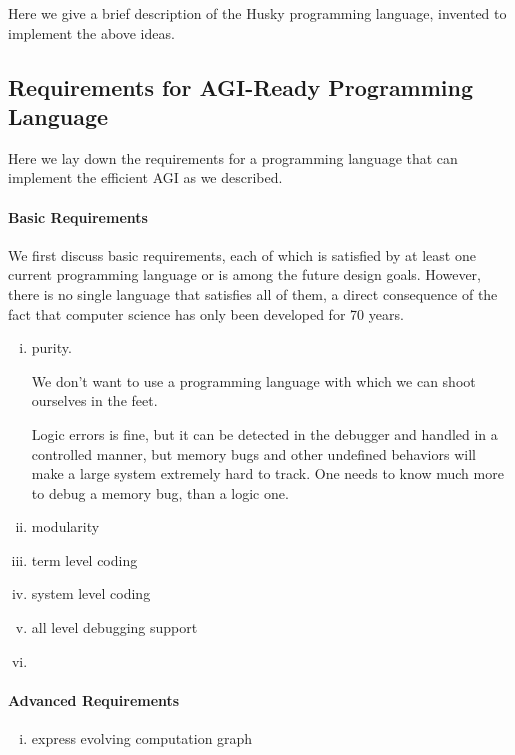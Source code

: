 \documentclass[../main.tex]{subfiles}
\begin{document}
Here we give a brief description of the Husky programming language, invented to implement the above ideas.

\subsection{Requirements for AGI-Ready Programming Language}

Here we lay down the requirements for a programming language that can implement the efficient AGI as we described.

\paragraph{Basic Requirements} We first discuss basic requirements, each of which is satisfied by at least one current programming language or is among the future design goals. However, there is no single language that satisfies all of them, a direct consequence of the fact that computer science has only been developed for 70 years.

\begin{enumerate}[(i)]
	\item purity.


We don't want to use a programming language with which we can shoot ourselves in the feet.

Logic errors is fine, but it can be detected in the debugger and handled in a controlled manner, but memory bugs and other undefined behaviors will make a large system extremely hard to track. One needs to know much more to debug a memory bug, than a logic one.

	\item modularity
	\item term level coding
	\item system level coding
	\item all level debugging support
	\item 
\end{enumerate}

\paragraph{Advanced Requirements}

\begin{enumerate} [(i)]
	\item express evolving computation graph
\end{enumerate}


\subsection{}
\end{document}
